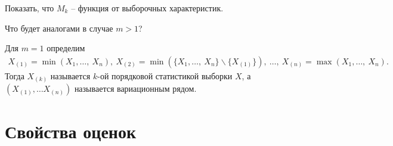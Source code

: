 \begin{exercise}
Показать, что $\displaystyle M_{k}$ -- функция от выборочных характеристик.
\end{exercise}
\begin{exercise}
Что будет аналогами в случае $\displaystyle m >1$?
\end{exercise}
\begin{definition}
Для $\displaystyle m=1$ определим
\begin{gather*}
    X_{( 1)} =\min( X_{1} ,\dotsc ,\ X_{n}),\ X_{( 2)} =\min(\{X_{1},\dotsc,\ X_{n}\} \backslash \{X_{( 1)}\}),\ \dotsc,\ X_{( n)} =\max( X_{1}, \dotsc,\ X_{n}).
\end{gather*}
Тогда $\displaystyle X_{( k)}$ называется $\displaystyle k$-ой порядковой статистикой выборки $\displaystyle X$, а $\displaystyle ( X_{( 1)} ,\dotsc X_{( n)})$ называется вариационным рядом.
\end{definition}
\section{Свойства оценок}

